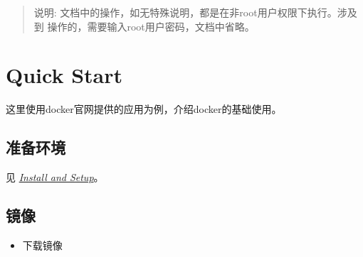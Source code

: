 \documentclass[letterpaper,10pt,english]{sphinxmanual}
\begin{document}
\begin{sphinxVerbatim}[commandchars=\\\{\}]
   
   
   
 
 
 
   

    
\end{sphinxVerbatim}
\begin{quote}

说明: 文档中的操作，如无特殊说明，都是在非root用户权限下执行。涉及到  操作的，需要输入root用户密码，文档中省略。
\end{quote}


\section{Quick Start}
\label{\detokenize{docker/intro:quick-start}}
这里使用docker官网提供的应用为例，介绍docker的基础使用。


\subsection{准备环境}
\label{\detokenize{docker/intro:id10}}
见 {\hyperref[\detokenize{docker/intro:install-and-setup}]{\emph{Install and Setup}}}。


\subsection{镜像}
\label{\detokenize{docker/intro:id11}}\begin{itemize}
\item {} 
下载镜像

\end{itemize}

\begin{sphinxVerbatim}[commandchars=\\\{\}]
   
\end{sphinxVerbatim}
\end{document}

